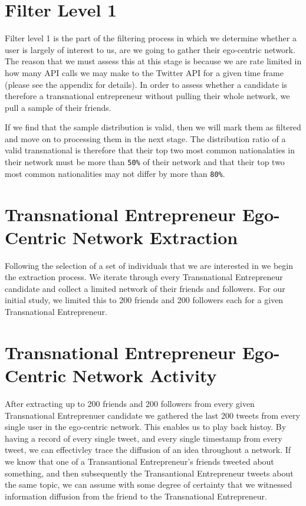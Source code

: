 \section{Filter Level 1}
Filter level 1 is the part of the filtering process in which we
determine whether a user is largely of interest to us, are we going to
gather their ego-centric network. The reason that we must assess this
at this stage is because we are rate limited in how many API calls we
may make to the Twitter API for a given time frame (please see the
appendix for details). In order to assess whether a candidate is
therefore a transnational entrepreneur without pulling their whole
network, we pull a sample of their friends.

If we find that the sample distribution is valid, then we will mark
them as filtered and move on to processing them in the next stage. The
distribution ratio of a valid transnational is therefore that their
top two most common nationalaties in their network must be more than
\verb|50%| of their network and that their top two most common
nationalities may not differ by more than \verb|80%|.

\section{Transnational Entrepreneur Ego-Centric Network Extraction}
Following the selection of a set of individuals that we are interested
in we begin the extraction process. We iterate through every
Transnational Entrepreneur candidate and collect a limited network of
their friends and followers. For our initial study, we limited this to
200 friends and 200 followers each for a given Transnational
Entrepreneur.

\section{Transnational Entrepreneur Ego-Centric Network Activity}
After extracting up to 200 friends and 200 followers from every given
Transnational Entreprenuer candidate we gathered the last 200 tweets
from every single user in the ego-centric network. This enables us to
play back histoy. By having a record of every single tweet, and every
single timestamp from every tweet, we can effectivley trace the
diffusion of an idea throughout a network. If we know that one of a
Transantional Entrepreneur's friends tweeted about something, and then
subsequently the Transantional Entrepreneur tweets about the same
topic, we can assume with some degree of certainty that we witnessed
information diffusion from the friend to the Transnational
Entrepreneur.

